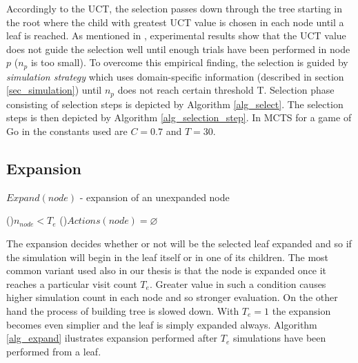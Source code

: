 Accordingly to the UCT, the selection passes down through the tree starting in the
root where the child with greatest UCT value is chosen in each node until a leaf is reached.
As mentioned in \cite{Chaslot2008}, experimental results show that the UCT value does not 
guide the selection well until
enough trials have been performed in node $p$ ($n_p$ is too small). To overcome this empirical
finding, the selection is guided by \emph{simulation strategy} which uses domain-specific
information (described in section
\ref{sec_simulation}) until $n_p$ does not reach certain threshold T. Selection phase
consisting of selection steps is
depicted by Algorithm \ref{alg_select}. The selection steps is then depicted by Algorithm
\ref{alg_selection_step}. In MCTS for a game of Go in \cite{Chaslot2008} the constants used
are $C= 0.7$ and $T=30$.




\subsection{Expansion}
\label{sec_expansion}


\begin{algorithm}
\DontPrintSemicolon
\caption{$Expand(node)$ - expansion of an unexpanded node\label{alg_expand}}
\If(){$n_{node} < T_e$}{
}
\If(){$Actions(node) = \varnothing$}{
}
\end{algorithm}

The expansion decides whether or not will be the selected leaf expanded and so if the simulation
will begin in the leaf itself or in one of its children. The most common variant used also in our
thesis is that the node is
expanded once it reaches a particular visit count $T_e$. Greater value in such a condition causes higher
simulation count in each node and so stronger evaluation. On the other hand the process of building
tree is slowed down. With $T_e=1$ the expansion becomes even simplier and the leaf is simply
expanded always. Algorithm \ref{alg_expand} ilustrates expansion performed after $T_e$
simulations have been performed from a leaf.


